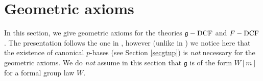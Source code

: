 \documentclass[10pt]{amsart}
\DeclareMathOperator{\sep}{sep}\DeclareMathOperator{\tw}{tw}\DeclareMathOperator{\ord}{ord}\DeclareMathOperator{\ffix}{Fix}
\theoremstyle{definition}
\begin{document}

\section{Geometric axioms}\label{secaxioms}
\noindent
In this section, we give geometric axioms for the theories $\mathfrak{g}-\operatorname{DCF}$ and $F-\operatorname{DCF}$.  The presentation follows the one in \cite{K3}, however (unlike in \cite{K3}) we notice here that the existence of canonical $p$-bases (see Section \ref{secgtup}) is \emph{not} necessary for the geometric axioms. We do \emph{not} assume in this section that $\mathfrak{g}$ is of the form $W[m]$ for a formal group law $W$.
\end{document}
